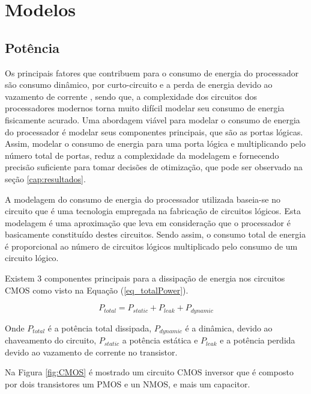 \chapter{Modelos} \label{cap:modelos}

\section{Potência}  \label{sec:potencia}

Os principais fatores que contribuem para o consumo de energia do processador são consumo dinâmico, por curto-circuito e a perda de energia devido ao vazamento de corrente \cite{Rauber2014, Goel2016, Du2017, Gonzalez1997}, sendo que, a complexidade dos circuitos dos processadores modernos torna muito difícil modelar seu consumo de energia fisicamente acurado. Uma abordagem viável para modelar o consumo de energia do processador é modelar seus componentes principais, que são as portas lógicas. Assim, modelar o consumo de energia para uma porta lógica e multiplicando pelo número total de portas, reduz a complexidade da modelagem e fornecendo precisão suficiente para tomar decisões de otimização, que pode ser observado na seção \ref{cap:resultados}.

A modelagem do consumo de energia do processador utilizada baseia-se no circuito  \cite{Sarwar1997, Butzen2007} que é uma tecnologia empregada na fabricação de circuitos lógicos. Esta modelagem é uma aproximação que leva em consideração que o processador é basicamente constituído destes circuitos. Sendo assim, o consumo total de energia é proporcional ao número de circuitos lógicos multiplicado pelo consumo de um circuito lógico.

Existem 3 componentes principais para a dissipação de energia nos circuitos CMOS como visto na Equação (\ref{eq_totalPower}).

\begin{equation}
P_{total}=P_{static}+P_{leak}+P_{dynamic} \label{eq_totalPower}
\end{equation}

Onde $P_{total}$ é a potência total dissipada, $P_{dynamic}$ é a dinâmica, devido ao chaveamento do circuito, $P_{static}$ a potência estática e $P_{leak}$ e a potência  perdida devido ao vazamento de corrente no transistor.

Na Figura \ref{fig:CMOS} é mostrado um circuito CMOS inversor que é composto por dois transistores um PMOS e un NMOS, e mais um capacitor.

